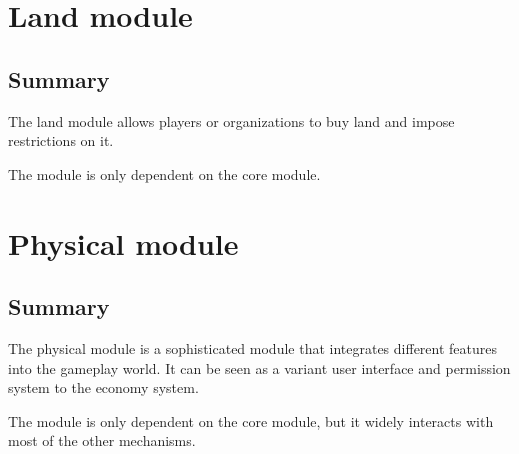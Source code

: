 \documentclass{report}
\begin{document}
	\chapter{Land module}
		\section{Summary}

			The land module allows players or organizations to buy land and impose restrictions on it.

			The module is only dependent on the core module.

	\chapter{Physical module}
		\label{sec:physical-module}
		\section{Summary}
			The physical module is a sophisticated module that integrates different features into the gameplay world.
			It can be seen as a variant user interface and permission system to the economy system.

			The module is only dependent on the core module, but it widely interacts with most of the other mechanisms.
\end{document}
